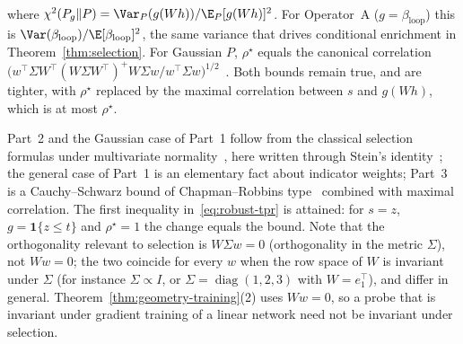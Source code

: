 \begin{theorem}
\begin{enumerate}
\begin{align}
  \end{align}
  where $\chi^2(P_g \| P) = \Var_P(g(Wh)) / \E_P[g(Wh)]^2$. For Operator~A ($g = \beta_{\mathrm{loop}}$) this is $\Var(\beta_{\mathrm{loop}})/\E[\beta_{\mathrm{loop}}]^2$, the same variance that drives conditional enrichment in Theorem~\ref{thm:selection}. For Gaussian $P$, $\rho^\star$ equals the canonical correlation $\big(w^\top \Sigma W^\top (W\Sigma W^\top)^{+} W \Sigma w / w^\top \Sigma w\big)^{1/2}$~\cite{lancaster1957,kolmogorov1960}. Both bounds remain true, and are tighter, with $\rho^\star$ replaced by the maximal correlation between $s$ and $g(Wh)$, which is at most $\rho^\star$.
\end{enumerate}
\end{theorem}

Part~2 and the Gaussian case of Part~1 follow from the classical selection formulas under multivariate normality~\cite{pearson1903,aitken1934,lawley1943}, here written through Stein's identity~\cite{stein1981}; the general case of Part~1 is an elementary fact about indicator weights; Part~3 is a Cauchy--Schwarz bound of Chapman--Robbins type~\cite{chapman1951} combined with maximal correlation. The first inequality in~\eqref{eq:robust-tpr} is attained: for $s = z$, $g = \mathbf{1}\{z \le t\}$ and $\rho^\star = 1$ the change equals the bound. Note that the orthogonality relevant to selection is $W\Sigma w = 0$ (orthogonality in the metric $\Sigma$), not $Ww = 0$; the two coincide for every $w$ when the row space of $W$ is invariant under $\Sigma$ (for instance $\Sigma \propto I$, or $\Sigma = \operatorname{diag}(1,2,3)$ with $W = e_1^\top$), and differ in general. Theorem~\ref{thm:geometry-training}(2) uses $Ww = 0$, so a probe that is invariant under gradient training of a linear network need not be invariant under selection.

